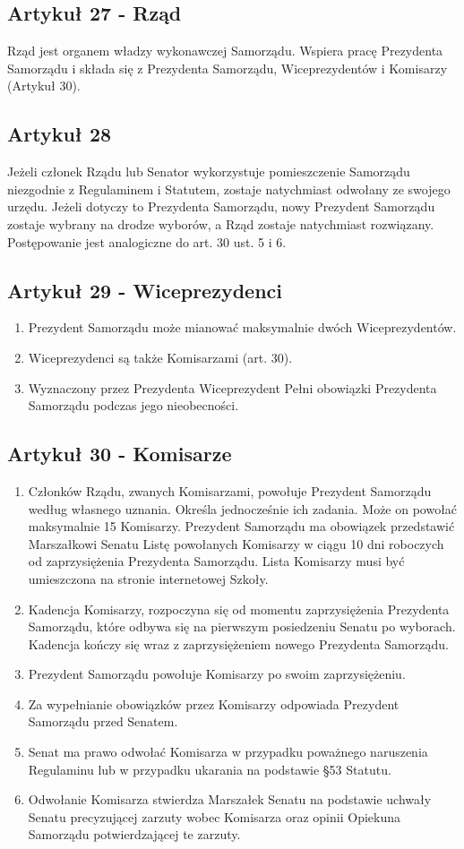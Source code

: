 \documentclass[14pt]{article}
\newenvironment{ustepy}{%
	\begin{enumerate}[leftmargin=1.5em, itemindent=1pt, labelwidth=1em, itemsep=5pt]
	}{%
	\end{enumerate}
}
\begin{document}
\subsection*{Artykuł 27 - Rząd}
Rząd jest organem władzy wykonawczej Samorządu. Wspiera pracę Prezydenta Samorządu i składa się z Prezydenta Samorządu, Wiceprezydentów i Komisarzy (Artykuł 30).

\subsection*{Artykuł 28}
Jeżeli członek Rządu lub Senator wykorzystuje pomieszczenie Samorządu niezgodnie z Regulaminem i Statutem, zostaje natychmiast odwołany ze swojego urzędu. Jeżeli dotyczy to Prezydenta Samorządu, nowy Prezydent Samorządu zostaje wybrany na drodze wyborów, a Rząd zostaje natychmiast rozwiązany. Postępowanie jest analogiczne do art. 30 ust. 5 i 6.

\subsection*{Artykuł 29 - Wiceprezydenci}
\begin{ustepy}
	\item Prezydent Samorządu może mianować maksymalnie dwóch Wiceprezydentów. 
	\item Wiceprezydenci są także Komisarzami (art. 30).
	\item Wyznaczony przez Prezydenta Wiceprezydent Pełni obowiązki Prezydenta Samorządu podczas jego nieobecności.
\end{ustepy}
\newpage
\subsection*{Artykuł 30 - Komisarze}
\begin{ustepy}
	\item Członków Rządu, zwanych Komisarzami, powołuje Prezydent Samorządu według własnego uznania. Określa jednocześnie ich zadania. Może on powołać maksymalnie 15 Komisarzy. Prezydent Samorządu ma obowiązek przedstawić Marszałkowi Senatu Listę powołanych Komisarzy w ciągu 10 dni roboczych od zaprzysiężenia Prezydenta Samorządu. Lista Komisarzy musi być umieszczona na stronie internetowej Szkoły.
	\item Kadencja Komisarzy, rozpoczyna się od momentu zaprzysiężenia Prezydenta Samorządu, które odbywa się na pierwszym posiedzeniu Senatu po wyborach. Kadencja kończy się wraz z zaprzysiężeniem nowego Prezydenta Samorządu.
	\item Prezydent Samorządu powołuje Komisarzy po swoim zaprzysiężeniu.
	\item Za wypełnianie obowiązków przez Komisarzy odpowiada Prezydent Samorządu przed Senatem.
	\item Senat ma prawo odwołać Komisarza w przypadku poważnego naruszenia Regulaminu lub w przypadku ukarania na podstawie §53 Statutu.
	\item Odwołanie Komisarza stwierdza Marszałek Senatu na podstawie uchwały Senatu precyzującej zarzuty wobec Komisarza oraz opinii Opiekuna Samorządu potwierdzającej te zarzuty.
\end{ustepy}
\end{document}
